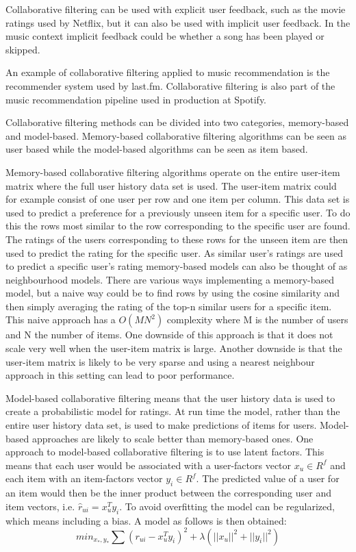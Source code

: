 \documentclass[a4paper,11pt]{kth-mag}
\begin{document}
Collaborative filtering can be used with explicit user feedback, such as the movie ratings used by Netflix, but it can also be used with implicit user feedback\cite{hu2008collaborative}. In the music context implicit feedback could be whether a song has been played or skipped.

An example of collaborative filtering applied to music recommendation is the recommender system used by last.fm. Collaborative filtering is also part of the music recommendation pipeline used in production at Spotify.

Collaborative filtering methods can be divided into two categories, memory-based and model-based. Memory-based collaborative filtering algorithms can be seen as user based while the model-based algorithms can be seen as item based\cite{sarwar2001item}.

Memory-based collaborative filtering algorithms operate on the entire user-item matrix where the full user history data set is used. The user-item matrix could for example consist of one user per row and one item per column. This data set is used to predict a preference for a previously unseen item for a specific user. To do this the rows most similar to the row corresponding to the specific user are found. The ratings of the users corresponding to these rows for the unseen item are then used to predict the rating for the specific user. As similar user's ratings are used to predict a specific user's rating memory-based models can also be thought of as neighbourhood models\cite{hu2008collaborative}. There are various ways implementing a memory-based model, but a naive way could be to find rows by using the cosine similarity and then simply averaging the rating of the top-n similar users for a specific item. This naive approach has a $O(MN^2)$ complexity where M is the number of users and N the number of items. One downside of this approach is that it does not scale very well when the user-item matrix is large. Another downside is that the user-item matrix is likely to be very sparse and using a nearest neighbour approach in this setting can lead to poor performance\cite{sarwar2001item}\cite{su2009survey}.

Model-based collaborative filtering means that the user history data is used to create a probabilistic model for ratings. At run time the model, rather than the entire user history data set, is used to make predictions of items for users. Model-based approaches are likely to scale better than memory-based ones\cite{sarwar2001item}. One approach to model-based collaborative filtering is to use latent factors. This means that each user would be associated with a user-factors vector $x_u \in R^f$ and each item with an item-factors vector $y_i \in R^f$. The predicted value of a user for an item would then be the inner product between the corresponding user and item vectors, i.e. $\hat{r}_{ui} = x_u^T y_i$. To avoid overfitting the model can be regularized, which means including a bias. A model as follows is then obtained: 
\begin{equation}
min_{x_*,y_*} \sum (r_{ui} - x_u^Ty_i)^2 +  \lambda(||x_u||^2 + ||y_i||^2)
\end{equation}
\end{document}
